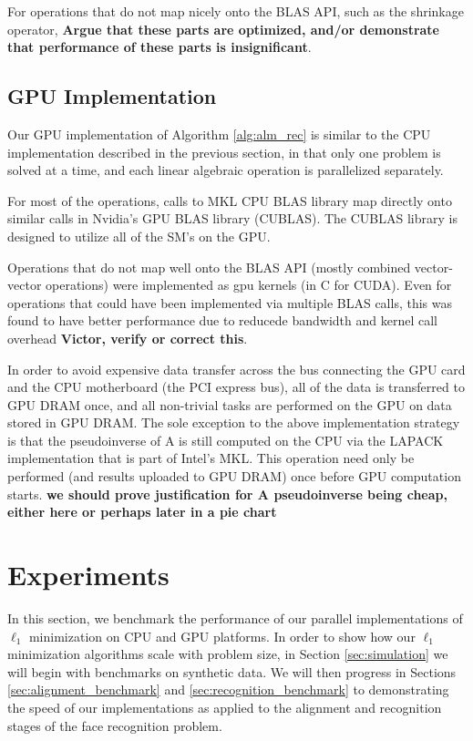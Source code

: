 \documentclass[10pt,twocolumn,letterpaper]{article}
\begin{document}
For operations that do not map nicely onto the BLAS API, such as the shrinkage
operator, {\bf Argue that these parts are optimized, and/or demonstrate that
performance of these parts is insignificant}.

\subsection{GPU Implementation} Our GPU implementation of Algorithm
\ref{alg:alm_rec} is similar to the CPU implementation described in the
previous section, in that only one problem is solved at a time, and each linear
algebraic operation is parallelized separately.

For most of the operations, calls to MKL CPU BLAS library map directly onto
similar calls in Nvidia's GPU BLAS library (CUBLAS).  The CUBLAS library is
designed to utilize all of the SM's on the GPU.  

Operations that do not map well onto the BLAS API (mostly combined
vector-vector operations) were implemented as gpu kernels (in C for CUDA).
Even for operations that could have been implemented via multiple BLAS calls,
this was found to have better performance due to reducede bandwidth and kernel
call overhead {\bf Victor, verify or correct this}.

In order to avoid expensive data transfer across the bus connecting the GPU
card and the CPU motherboard (the PCI express bus), all of the data is
transferred to GPU DRAM once, and all non-trivial tasks are performed on the
GPU on data stored in GPU DRAM.  The sole exception to the above implementation
strategy is that the pseudoinverse of A is still computed on the CPU via the
LAPACK implementation that is part of Intel's MKL. This operation need only be
performed (and results uploaded to GPU DRAM) once before GPU computation
starts. {\bf we should prove justification for A pseudoinverse being cheap,
either here or perhaps later in a pie chart}

\section{Experiments}

In this section, we benchmark the performance of our parallel implementations
of $\ell_1$ minimization on CPU and GPU platforms.  In order to show how our
$\ell_1$ minimization algorithms scale with problem size, in Section
\ref{sec:simulation} we will begin with benchmarks on synthetic data.  We will
then progress in Sections \ref{sec:alignment_benchmark} and
\ref{sec:recognition_benchmark} to demonstrating the speed of our
implementations as applied to the alignment and recognition stages of the face
recognition problem.
\end{document}
